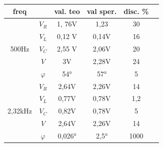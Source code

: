 \documentclass[12pt]{article}
\begin{document}
\begin{center}
    \begin{table}[!h]
        
    
    \begin{tabular}{|c|c|c|c|c|c|}
     \hline
       \rowcolor{nred} freq &  & val. teo & val sper. & disc. \%\\ \hline
       
      \multirow{5}{*}{500Hz} &\cellcolor{norange} $V_R$ & \cellcolor{norange}1, 76V& \cellcolor{norange}1,23&\cellcolor{norange} 30\\ \cline{2-5}
      
                            & \cellcolor{norange}$V_L$ &\cellcolor{norange} 0,12 V&\cellcolor{norange} 0,14V &\cellcolor{norange}16 \\ \cline{2-5}

                            & \cellcolor{norange}$V_C$ &\cellcolor{norange}2,55 V&\cellcolor{norange} 2,06V& \cellcolor{norange}20\\\cline{2-5}
     
                            &\cellcolor{norange} $V$   &\cellcolor{norange} 3V&\cellcolor{norange} 2,28V& \cellcolor{norange}24 \\\cline{2-5}

                            &\cellcolor{norange} $\varphi$ &\cellcolor{norange}54° & \cellcolor{norange}57°& \cellcolor{norange}5 \\\hline
    
                            \multirow{5}{*}{2,32kHz} &\cellcolor{nyellow} $V_R$ &\cellcolor{nyellow} 2,64V& \cellcolor{nyellow}2,26V& \cellcolor{nyellow}14\\\cline{2-5}
      
                            &\cellcolor{nyellow} $V_L$ &\cellcolor{nyellow} 0,77V& \cellcolor{nyellow}0,78V &\cellcolor{nyellow}1,2 \\\cline{2-5}
    
                            &\cellcolor{nyellow} $V_C$ &\cellcolor{nyellow}0,82V&\cellcolor{nyellow} 0,78V&\cellcolor{nyellow} 5\\\cline{2-5}
    
                            &\cellcolor{nyellow} $V$   &\cellcolor{nyellow} 2,64V&\cellcolor{nyellow} 2,26V&\cellcolor{nyellow} 14 \\\cline{2-5}
    
                            & \cellcolor{nyellow}$\varphi$ &\cellcolor{nyellow}0,026° &\cellcolor{nyellow} 2,5°& \cellcolor{nyellow}1000\\\hline
    

\end{tabular}
\end{table}
\end{center}
\end{document}
